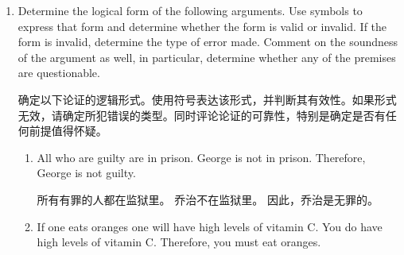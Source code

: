 \begin{enumerate}
  \item Determine the logical form of the following arguments.  Use symbols
  to express that form and determine whether the form is valid or invalid.
  If the form is invalid, determine the type of error made.
  Comment on the 
  soundness of the argument as well, in particular, determine whether any of
  the premises are questionable.
  
  确定以下论证的逻辑形式。使用符号表达该形式，并判断其有效性。如果形式无效，请确定所犯错误的类型。同时评论论证的可靠性，特别是确定是否有任何前提值得怀疑。
  \begin{enumerate}
  \item All who are guilty are in prison. \newline
    George is not in prison. \newline
    Therefore, George is not guilty.
   
  所有有罪的人都在监狱里。\newline
  乔治不在监狱里。\newline
  因此，乔治是无罪的。
   
   \wbvfill
   
  
  \item If one eats oranges one will have high levels of vitamin C. \newline
    You do have high levels of vitamin C. \newline
    Therefore, you must eat oranges.
  

\end{enumerate}
\end{enumerate}

